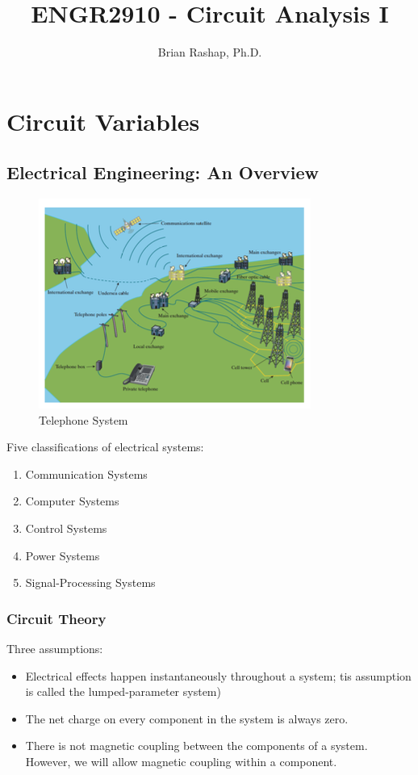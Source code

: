 \documentclass[14pt]{memoir}
\author{Brian Rashap, Ph.D.}
\title{ENGR2910 - Circuit Analysis I}
\begin{document}
\frontmatter

\maketitle


\mainmatter

\chapter{Circuit Variables}

\section{Electrical Engineering: An Overview}

\begin{figure}[h]
\begin{center}
\includegraphics[scale=0.40]{fig/fig01_01.png}
\caption{Telephone System}
\label{fig:01_01}
\end{center}
\end{figure}

Five classifications of electrical systems:
\begin{enumerate}
\item Communication Systems
\item Computer Systems
\item Control Systems
\item Power Systems
\item Signal-Processing Systems
\end{enumerate}

\subsection{Circuit Theory}
Three assumptions:
\begin{itemize}
\item Electrical effects happen instantaneously throughout a system; tis assumption is called the lumped-parameter system)
\item The net charge on every component in the system is always zero.
\item There is not magnetic coupling between the components of a system. However, we will allow magnetic coupling within a component.
\end{itemize}
\end{document}
